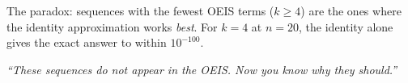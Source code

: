 \documentclass[11pt,letterpaper]{article}
\theoremstyle{definition}
\theoremstyle{remark}
\begin{document}
\noindent The paradox: sequences with the fewest OEIS terms ($k \geq 4$) are the ones where the identity approximation works \emph{best}. For $k = 4$ at $n = 20$, the identity alone gives the exact answer to within $10^{-100}$.

\vfill
\begin{center}
\small\itshape
``These sequences do not appear in the OEIS. Now you know \emph{why} they should.''
\end{center}
\end{document}
